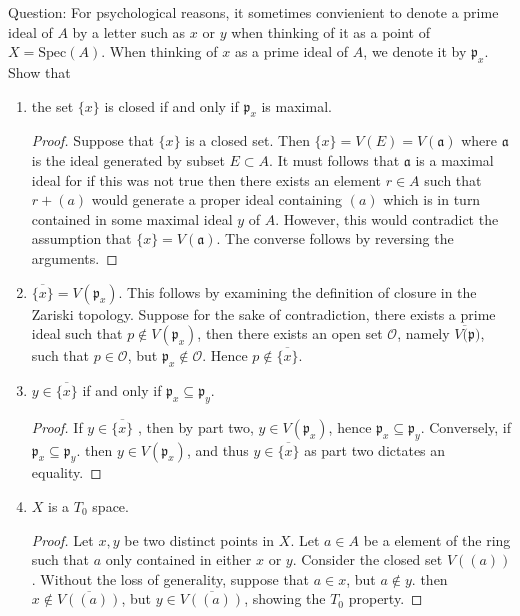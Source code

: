 \documentclass[12pt]{article}
\begin{document}
Question: For psychological reasons, it sometimes convienient to denote a prime ideal of $A$ by a letter such as $x$ or $y$ when thinking of it as a point of
$X = \text{Spec}(A)$. When thinking of $x$ as a prime ideal of $A$, we denote it by $\mathfrak{p}_x$. Show that 
\begin{enumerate}
 \item the set $\{x\}$ is closed if and only if $\mathfrak{p}_x$ is maximal.
 \begin{proof}
  Suppose that $\{x\}$ is a closed set. Then $\{x\} = V(E) = V(\mathfrak{a})$ where $\mathfrak{a}$ is the ideal generated by subset $E \subset A$. It must follows that 
  $\mathfrak{a}$ is a maximal ideal for if this was not true then there exists an element $r \in A$ such that 
  $r + (a)$ would generate a proper ideal containing $(a)$ which is in turn contained in some maximal ideal $y$ of $A$.
  However, this would contradict the assumption that $\{x\} = V(\mathfrak{a})$. The converse follows by reversing the arguments. 
 \end{proof}
 \item $\overline{\{x\}} = V(\mathfrak{p}_x)$. This follows by examining the definition of closure in the Zariski topology.
 Suppose for the sake of contradiction, there exists a prime ideal such that $p \not\in V(\mathfrak{p}_x)$, then there exists an open set $\mathcal{O}$, namely
 $\overline{V(\mathfrak{p}})$, such that $p \in \mathcal{O}$, but $\mathfrak{p}_x \not\in \mathcal{O}$. Hence $p \not\in \overline{\{x\}}$.
 
 \item $y \in \overline{\{x\}}$ if and only if $\mathfrak{p}_x \subseteq \mathfrak{p}_y$.
 \begin{proof}
  If $y \in \overline{\{x\}}$ , then by part two, $y \in V(\mathfrak{p}_x)$, hence $\mathfrak{p}_x \subseteq \mathfrak{p}_y$. Conversely, if $\mathfrak{p}_x \subseteq \mathfrak{p}_y$. then
  $y \in V(\mathfrak{p}_x)$, and thus $y \in \overline{\{x\}}$ as part two dictates an equality.
 \end{proof}
 
 \item $X$ is a $T_0$ space.
 
 \begin{proof}
  Let $x,y$ be two distinct points in $X$. Let $a \in A$ be a element of the ring such that $a$ only contained in either $x$ or $y$.
  Consider the closed set $V((a))$. Without the loss of generality, suppose that $a \in x$, but $a \not\in y$. then 
  $x \not\in \overline{V((a))}$, but $y \in \overline{V((a))}$, showing the $T_0$ property.
 \end{proof}
\end{enumerate}
\end{document}
